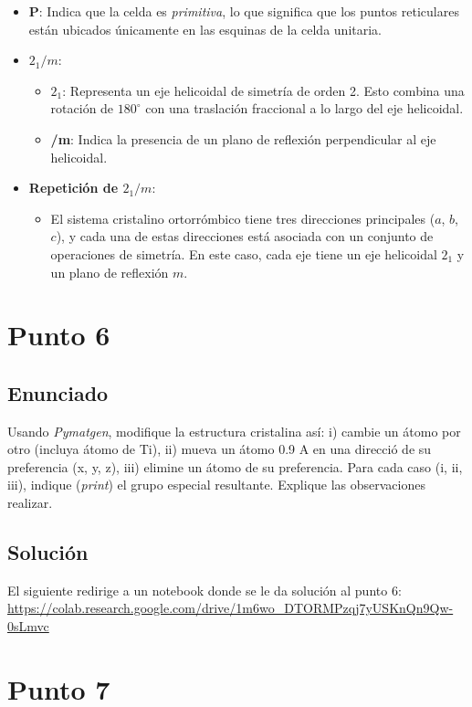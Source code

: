 \documentclass[a4paper,12pt]{article}
\begin{document}
\begin{itemize}
    \item \textbf{P}:
    Indica que la celda es \textit{primitiva}, lo que significa que los puntos reticulares están ubicados únicamente en las esquinas de la celda unitaria.

    \item \textbf{$2_1/m$}:
    \begin{itemize}
        \item \textbf{$2_1$}: Representa un eje helicoidal de simetría de orden 2. Esto combina una rotación de $180^\circ$ con una traslación fraccional a lo largo del eje helicoidal.
        \item \textbf{/m}: Indica la presencia de un plano de reflexión perpendicular al eje helicoidal.
    \end{itemize}

    \item \textbf{Repetición de $2_1/m$}:
    \begin{itemize}
        \item El sistema cristalino ortorrómbico tiene tres direcciones principales ($a$, $b$, $c$), y cada una de estas direcciones está asociada con un conjunto de operaciones de simetría. En este caso, cada eje tiene un eje helicoidal $2_1$ y un plano de reflexión $m$.
    \end{itemize}
\end{itemize}
\section{Punto 6}
\subsection*{Enunciado}
Usando \textit{Pymatgen}, modifique la estructura cristalina así: i) cambie un átomo por otro (incluya átomo de Ti), ii) mueva un átomo 0.9 A en una direcció de su preferencia (x, y, z), iii) elimine un átomo de su preferencia. Para cada caso (i, ii, iii), indique (\textit{print}) el grupo especial resultante. Explique las observaciones realizar.
\subsection*{Solución}
El siguiente redirige a un notebook donde se le da solución al punto 6: \url{https://colab.research.google.com/drive/1m6wo_DTORMPzqj7yUSKnQn9Qw-0sLmvc}
\section{Punto 7}
\end{document}
